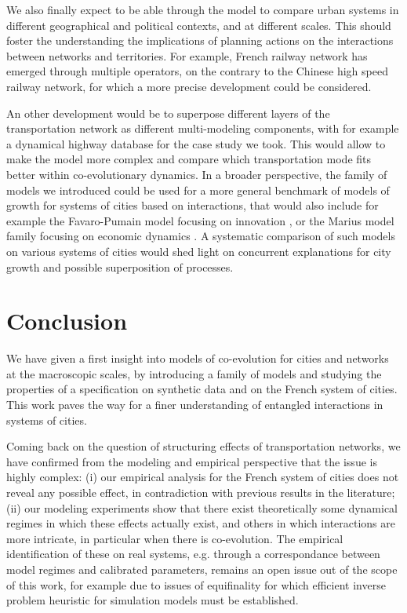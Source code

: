 \documentclass[11pt]{article}
\begin{document}
We also finally expect to be able through the model to compare urban systems in different geographical and political contexts, and at different scales. This should foster the understanding the implications of planning actions on the interactions between networks and territories. For example, French railway network has emerged through multiple operators, on the contrary to the Chinese high speed railway network, for which a more precise development could be considered.


An other development would be to superpose different layers of the transportation network as different multi-modeling components, with for example a dynamical highway database for the case study we took. This would allow to make the model more complex and compare which transportation mode fits better within co-evolutionary dynamics. In a broader perspective, the family of models we introduced could be used for a more general benchmark of models of growth for systems of cities based on interactions, that would also include for example the Favaro-Pumain model focusing on innovation \citep{favaro2011gibrat}, or the Marius model family focusing on economic dynamics \citep{cottineau2014evolution}. A systematic comparison of such models on various systems of cities would shed light on concurrent explanations for city growth and possible superposition of processes.


\section*{Conclusion}

We have given a first insight into models of co-evolution for cities and networks at the macroscopic scales, by introducing a family of models and studying the properties of a specification on synthetic data and on the French system of cities. This work paves the way for a finer understanding of entangled interactions in systems of cities.

Coming back on the question of structuring effects of transportation networks, we have confirmed from the modeling and empirical perspective that the issue is highly complex: (i) our empirical analysis for the French system of cities does not reveal any possible effect, in contradiction with previous results in the literature; (ii) our modeling experiments show that there exist theoretically some dynamical regimes in which these effects actually exist, and others in which interactions are more intricate, in particular when there is co-evolution. The empirical identification of these on real systems, e.g. through a correspondance between model regimes and calibrated parameters, remains an open issue out of the scope of this work, for example due to issues of equifinality for which efficient inverse problem heuristic for simulation models must be established.
\end{document}
